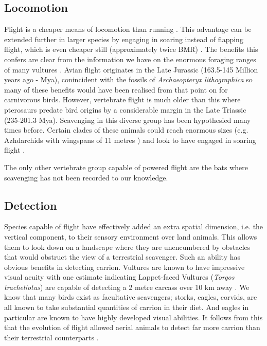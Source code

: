 \documentclass[a4paper,12pt]{article}
\begin{document}
\subsection*{Locomotion}
Flight is a cheaper means of locomotion than running \citep{tucker1975energetic}.
This advantage can be extended further in larger species by engaging in soaring instead of flapping flight, which is even cheaper still (approximately twice BMR) \citep{hedenstrom1993migration}.
The benefits this confers are clear from the information we have on the enormous foraging ranges of many vultures \citep{spiegel2013factors}.
Avian flight originates in the Late Jurassic (163.5-145 Million years ago - Mya), conincident with the fossils of \textit{Archaeopteryx lithographica} so many of these benefits would have been realised from that point on for carnivorous birds.
However, vertebrate flight is much older than this where pterosaurs predate bird origins by a considerable margin in the Late Triassic (235-201.3 Mya).
Scavenging in this diverse group has been hypothesied many times before.
Certain clades of these animals could reach enormous sizes (e.g. Azhdarchids with wingspans of 11 metres \citep{witton2010size}) and look to have engaged in soaring flight \citep{witton2010size}.

The only other vertebrate group capable of powered flight are the bats where scavenging has not been recorded to our knowledge.

\subsection*{Detection}
Species capable of flight have effectively added an extra spatial dimension, i.e. the vertical component, to their sensory environment over land animals.
This allows them to look down on a landscape where they are unencumbered by obstacles that would obstruct the view of a terrestrial scavenger.
Such an ability has obvious benefits in detecting carrion.
Vultures are known to have impressive visual acuity with one estimate indicating Lappet-faced Vultures (\textit{Torgos tracheliotus}) are capable of detecting a 2 metre carcass over 10 km away \citep{spiegel2013factors}.
We know that many birds exist as facultative scavengers; storks, eagles, corvids, are all known to take substantial quantities of carrion in their diet.
And eagles in particular are known to have highly developed visual abilities.
It follows from this that the evolution of flight allowed aerial animals to detect far more carrion than their terrestrial counterparts \citep{AR:AR22815}.
\end{document}
